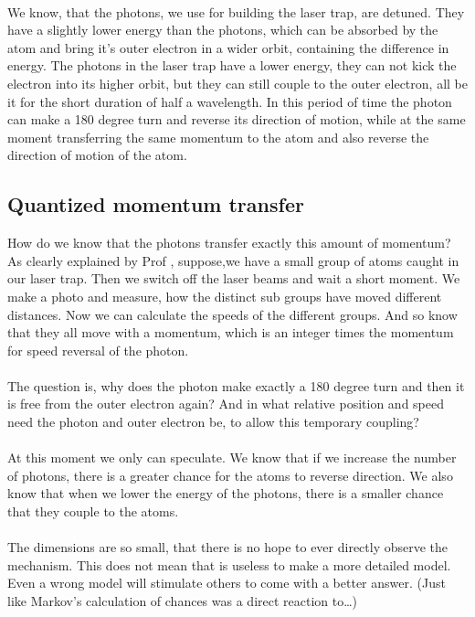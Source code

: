 \paragraph{}
We know, that the photons, we use for building the laser trap, are detuned. They have a slightly lower energy than the photons, which can be absorbed by the atom and bring it's outer electron in a wider orbit, containing the difference in energy. The photons in the laser trap have a lower energy, they can not kick the electron into its higher orbit, but they can still couple to the outer electron, all be it for the short duration of half a wavelength. In this period of time the photon can make a 180 degree turn and reverse its direction of motion, while at the same moment transferring the same momentum to the atom and also reverse the direction of motion of the atom.

\subsection{Quantized momentum transfer}
How do we know that the photons transfer exactly this amount of momentum? As clearly explained by Prof , suppose,we have a small group of atoms caught in our laser trap. Then we switch off the laser beams and wait a short moment. We make a photo and measure, how the distinct sub groups have moved different distances. Now we can calculate the speeds of the different groups. And so know that they all move with a momentum, which is an integer times the momentum for speed reversal of the photon.
\paragraph{}
The question is, why does the photon make exactly a 180 degree turn and then it is free from the outer electron again? And in what relative position and speed need the photon and outer electron be, to allow this temporary coupling?
\paragraph{}
At this moment we only can speculate. We know that if we increase the number of photons, there is a greater chance for the atoms to reverse direction. We also know that when we lower the energy of the photons, there is a smaller chance that they couple to the atoms.
\paragraph{}
The dimensions are so small, that there is no hope to ever directly observe the mechanism. This does not mean that is useless to make a more detailed model. Even a wrong model will stimulate others to come with a better answer. (Just like Markov's calculation of chances was a direct reaction to…)

